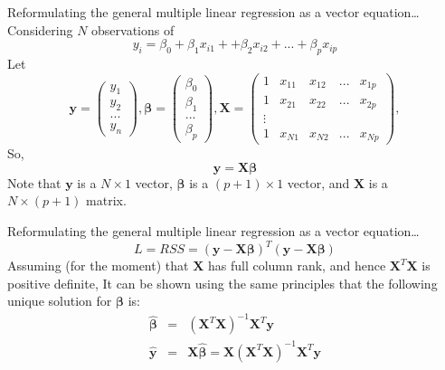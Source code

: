 \documentclass{beamer}
\let \vec \mathbf
\begin{document}
    \begin{frame}{Reformulating the general multiple linear regression as a vector equation…}
    Considering $N$ observations of
    \begin{equation*}
        y_i = \beta_0 + \beta_1 x_{i1} + + \beta_2 x_{i2} + ... + \beta_p x_{ip}
    \end{equation*}
    Let
    \begin{equation*}
        \vec{y} = \begin{pmatrix}y_1\\y_2\\...\\y_n\end{pmatrix}, \bm{\beta} = \begin{pmatrix}\beta_0\\\beta_1\\...\\\beta_p\end{pmatrix}, \vec{X} = \begin{pmatrix}1 & x_{11} & x_{12} & ... & x_{1p}\\
        1 & x_{21} & x_{22} & ... & x_{2p}\\
        \vdots & & & & \\
        1 & x_{N1} & x_{N2} & ... & x_{Np}\end{pmatrix}, 
    \end{equation*}
    So, 
    \begin{equation*}
        \vec{y} = \vec{X}\bm{\beta} 
    \end{equation*}
    Note that $\vec{y}$ is a $N \times 1$ vector,
    $\bm{\beta}$ is a $(p+1) \times 1$ vector, and $\vec{X}$ is a  $N \times (p+1)$ matrix.
\end{frame}


\begin{frame}{Reformulating the general multiple linear regression as a vector equation…}
    \begin{equation*}
        L = RSS = (\vec{y} - \vec{X}\bm{\beta})^T(\vec{y} - \vec{X}\bm{\beta})
    \end{equation*}
    Assuming (for the moment) that $\vec{X}$ has full column rank, and hence $\vec{X}^T\vec{X}$ is positive definite, It can be shown using the same principles that the following unique solution for $\bm{\beta}$ is:
    \begin{eqnarray*}
        \hat{\bm{\beta}} &=& (\vec{X}^T \vec{X})^{-1} \vec{X}^T \vec{y} \\
        \hat{\vec{y}} & = & \vec{X} \hat{\bm{\beta}} = \vec{X}(\vec{X}^T \vec{X})^{-1} \vec{X}^T \vec{y} 
    \end{eqnarray*}
\end{frame}
\end{document}
